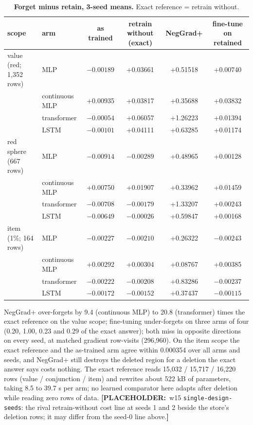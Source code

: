 \documentclass{article} %
\newcommand{\PLACEHOLDER}[1]{{\color{red}\textbf{[PLACEHOLDER:}~#1\textbf{]}}}
\begin{document}
\begin{table}[h]
\centering\small
\caption{\textbf{Forget minus retain, 3-seed means.} Exact reference = retrain without.}
\label{tab:unlearn}
\setlength{\tabcolsep}{3pt}
\begin{tabular}{llcccc}
\toprule
scope & arm & as trained & retrain without (exact) & NegGrad+ & fine-tune on retained \\
\midrule
value (red; 1,352 rows) & MLP & $-0.00189$ & +0.03661 & +0.51518 & +0.00740 \\
 & continuous MLP & +0.00935 & +0.03817 & +0.35688 & +0.03832 \\
 & transformer & $-0.00054$ & +0.06057 & +1.26223 & +0.01394 \\
 & LSTM & $-0.00101$ & +0.04111 & +0.63285 & +0.01174 \\
red sphere (667 rows) & MLP & $-0.00914$ & $-0.00289$ & +0.48965 & +0.00128 \\
 & continuous MLP & +0.00750 & +0.01907 & +0.33962 & +0.01459 \\
 & transformer & $-0.00708$ & $-0.00179$ & +1.33207 & +0.00243 \\
 & LSTM & $-0.00649$ & $-0.00026$ & +0.59847 & +0.00168 \\
item (1\%; 164 rows) & MLP & $-0.00227$ & $-0.00210$ & +0.26322 & $-0.00243$ \\
 & continuous MLP & +0.00292 & +0.00304 & +0.08767 & +0.00385 \\
 & transformer & $-0.00222$ & $-0.00208$ & +0.83286 & $-0.00237$ \\
 & LSTM & $-0.00172$ & $-0.00152$ & +0.37437 & $-0.00115$ \\
\bottomrule
\end{tabular}
\end{table}

\noindent NegGrad+ over-forgets by 9.4 (continuous MLP) to 20.8 (transformer) times the exact
reference on the value scope; fine-tuning under-forgets on three arms of four (0.20, 1.00, 0.23 and
0.29 of the exact answer); both miss in opposite directions on every seed, at matched gradient
row-visits (296,960). On the item scope the exact reference and the as-trained arm agree within
0.000354 over all arms and seeds, and NegGrad+ still destroys the deleted region for a deletion the
exact answer says costs nothing. The exact reference reads 15,032 / 15,717 / 16,220 rows (value /
conjunction / item) and rewrites about 522 kB of parameters, taking 8.5 to 39.7 s per arm; no learned
comparator here adapts after deletion while reading zero rows of data.
\PLACEHOLDER{w15 \texttt{single-design-seeds}: the rival retrain-without cost line at seeds 1 and 2
beside the store's deletion rows; it may differ from the seed-0 line above.}
\end{document}
